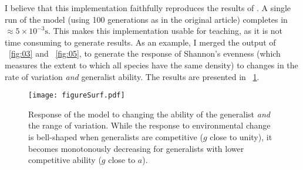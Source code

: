 \documentclass[10pt,a4paper,onecolumn]{article}
\renewcommand{\includegraphics}[2][]{\OldIncludegraphics[width=12cm, #1]{#2}}
\begin{document}
I believe that this implementation faithfully reproduces the results of
\textcite{wils94csg}. A single run of the model (using 100 generations
as in the original article) completes in
\(\approx 5\times 10^{-3} \text{s}\). This makes this implementation
usable for teaching, as it is not time consuming to generate results. As
an example, I merged the output of ~\ref{fig:03} and ~\ref{fig:05}, to
generate the response of Shannon's evenness (which measures the extent
to which all species have the same density) to changes in the rate of
variation \emph{and} generalist ability. The results are presented in
~\ref{fig:surf}.

\begin{figure}
\centering
\texttt{[image: figureSurf.pdf]}
\caption{Response of the model to changing the ability of the generalist
\emph{and} the range of variation. While the response to environmental
change is bell-shaped when generalists are competitive (\(g\) close to
unity), it becomes monotonously decreasing for generalists with lower
competitive ability (\(g\) close to \(a\)).}\label{fig:surf}
\end{figure}

{\sffamily \small
  \printbibliography[title=References]
}
\end{document}
